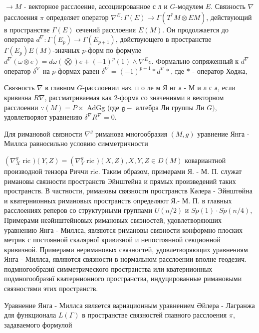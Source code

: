 \documentclass[10pt]{article}
\begin{document}
$\rightarrow M$ - векторное расслоение, ассоциированное с л и $G$-модулем $E$. Связность $\nabla$ расслоения $\pi$ определяет оператор $\nabla^{E}: \Gamma(E) \rightarrow \Gamma\left(T^{*} M \otimes E M\right)$, действующий в пространстве $\Gamma(E)$ сечений расслоения $E(M)$. Он продолжается до оператора $d^{\nabla}: \Gamma\left(E_{p}\right) \rightarrow \Gamma\left(E_{p+1}\right)$, дөйствующего в пространстве $\Gamma\left(E_{p}\right) E(M)$-значных $p$-форм по формуле $d^{\nabla}(\omega \otimes e)=d \omega(\bigotimes) e+(-1)^{p}(1) \wedge \nabla^{E} e$. Формально сопряженный к $d^{\nabla}$ оператор $\delta^{\nabla}$ на $p$-формах равен $\delta^{\nabla}=(-1)^{p+1} * d^{\nabla} *$, где $*$ - оператор Ходжа,



Связность $\nabla$ в главном $G$-расслоении наз. п о ле м Я нг а - М и л с а, если кривизна $R \nabla$, рассматриваемая как 2-форма со значениями в векторном расслоении $\because(M)=P \times$ AdGg (где $\mathfrak{g}-$ алгебра Ли группы Ли $G)$, удовлетворяөт уравнению $\delta^{\nabla} R^{\nabla}=0$.



Для римановой связности $\nabla^{g}$ риманова многообразия $(M, g)$ уравнение Янга - Миллса равносильно условию симметричности



$\left(\nabla_{X}^{g}\right.$ ric $)(Y, Z)=\left(\nabla_{Y}^{g}\right.$ ric $)(X, Z), X, Y, Z \in D(M)$ ковариантной производной тензора Риччи ric. Таким образом, примерами Я. - М. П. служат римановы связности пространств Эйнштейна и прямых произведений таких пространств. В частности, римановы связности пространств Кәлера - Эйнштөйна и кватернионных римановых пространств определяют Я.- М. П. в главных расслоениях реперов со структурными группами $U(n / 2)$ и $S p(1) \cdot S p(n / 4)$, Примерами неәйнштейновых римановых связностей, удовлетворяюших уравнению Янга - Миллса, являются римановы связности конформно плоских метрик с постоянной скалярної кривизной и непостоянной секционной кривизной. Примерами неримановых связностей, удовлетворяющих уравнениям Янга - Миллса, являются связности в нормальном расслоении вполне геодезич. подмногообразиї симметрического пространства или кватернионных подмногообразиї кватернионного пространства, индуцированные римановыми связностями этих пространств.



Уравнение Янга - Миллса является вариационным уравнением Әйлера - Лагранжа для функционала $L(\Gamma)$ в пространстве связностей главного расслоения $\pi$, задаваемого формулой
\end{document}
